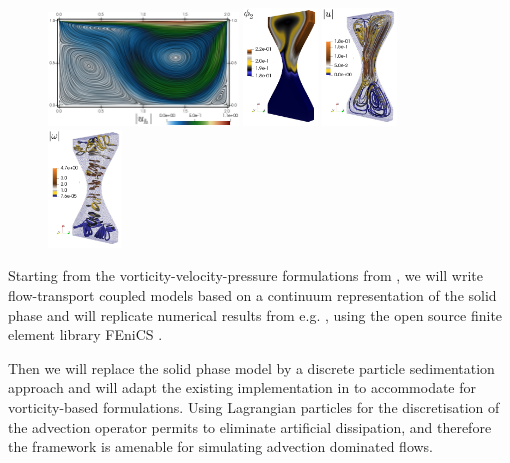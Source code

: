 \documentclass[10pt, a4paper]{article}
\begin{document}
\begin{figure}[h!]
\begin{center}
\includegraphics[width=0.45\textwidth]{ex02-lic}
\includegraphics[width=0.175\textwidth]{ex03phi22}
\includegraphics[width=0.175\textwidth]{ex03u2}
\includegraphics[width=0.175\textwidth]{ex03w2}
\end{center}
\label{fig:domains}
\end{figure}



Starting from the vorticity-velocity-pressure formulations from \cite{anaya19,anaya16}, we will write flow-transport coupled models based on a continuum representation of the solid phase and will replicate numerical results from e.g. \cite{alvarez}, using the open source finite element library FEniCS \cite{fenics}. 

Then we will replace the solid phase model by a discrete particle sedimentation approach and will adapt the existing implementation in \cite{leopart} to accommodate for vorticity-based formulations. Using Lagrangian particles for the discretisation of the advection operator permits to eliminate artificial dissipation, and therefore the framework is amenable for   simulating advection dominated flows. 
\end{document}
